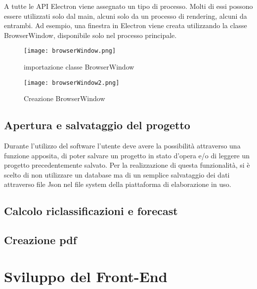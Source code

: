 A tutte le API Electron viene assegnato un tipo di processo. Molti di essi possono essere utilizzati solo dal main, alcuni solo da un processo di rendering, alcuni da entrambi. Ad esempio, una finestra in Electron viene creata utilizzando la classe BrowserWindow, disponibile solo nel processo principale.

\begin{figure}[H]
    \centering
    \texttt{[image: browserWindow.png]}
    \caption{importazione classe BrowserWindow}
    \label{fig:BrowserWindow}
\end{figure}

\begin{figure}[H]
    \centering
    \texttt{[image: browserWindow2.png]}
    \caption{Creazione BrowserWindow}
    \label{fig:BrowserWindow2}
\end{figure}



\subsection {Apertura e salvataggio del progetto}

Durante l'utilizzo del software l'utente deve avere la possibilità attraverso una funzione apposita, di poter salvare un progetto in stato d'opera e/o di leggere un progetto precedentemente salvato.
Per la realizzazione di questa funzionalità, si è scelto di non utilizzare un database ma di un semplice salvataggio dei dati attraverso file Json nel file system della piattaforma di elaborazione in uso.





\subsection {Calcolo riclassificazioni e forecast}



\subsection {Creazione pdf}




\newpage

\section{Sviluppo del Front-End}

